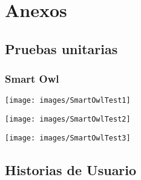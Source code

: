 \newpage
\chapter{Anexos}

\iffalse
\newpage
\section*{Pruebas unitarias}
\subsection*{Smart Owl}
\begin{center}
  \texttt{[image: images/SmartOwlTest1]}
\end{center}

\begin{center}
  \texttt{[image: images/SmartOwlTest2]}
\end{center}

\begin{center}
  \texttt{[image: images/SmartOwlTest3]}
\end{center}
%
%
\newpage
\section*{Historias de Usuario}
